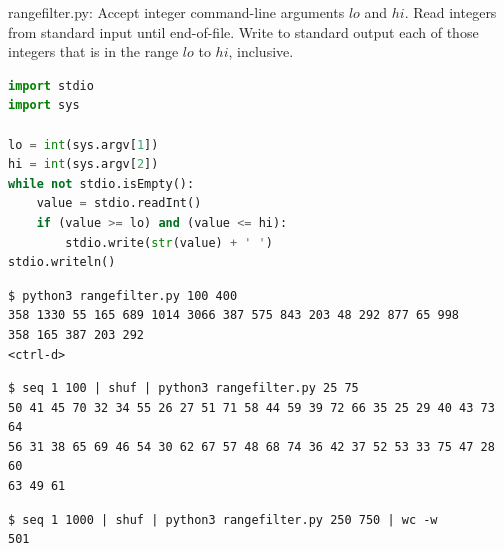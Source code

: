 \documentclass[8pt,a4paper,compress]{beamer}
\begin{document}
\begin{frame}[fragile]
\pause

\begin{framed}
\tiny rangefilter.py: Accept integer command-line arguments $lo$ and $hi$. Read integers from standard input until end-of-file. Write to standard output each of those integers that is in the range $lo$ to $hi$, inclusive.
\end{framed}

\begin{lstlisting}[language=Python,style=focusin]
import stdio
import sys

lo = int(sys.argv[1])
hi = int(sys.argv[2])
while not stdio.isEmpty():
    value = stdio.readInt()
    if (value >= lo) and (value <= hi):
        stdio.write(str(value) + ' ')
stdio.writeln()
\end{lstlisting}

\pause\bigskip

\begin{lstlisting}[language={},style=focusin]
$ python3 rangefilter.py 100 400
358 1330 55 165 689 1014 3066 387 575 843 203 48 292 877 65 998
358 165 387 203 292
<ctrl-d>
\end{lstlisting}

\pause\bigskip

\begin{lstlisting}[language={},style=focusin]
$ seq 1 100 | shuf | python3 rangefilter.py 25 75
50 41 45 70 32 34 55 26 27 51 71 58 44 59 39 72 66 35 25 29 40 43 73 64 
56 31 38 65 69 46 54 30 62 67 57 48 68 74 36 42 37 52 53 33 75 47 28 60 
63 49 61 
\end{lstlisting}

\pause\bigskip

\begin{lstlisting}[language={},style=focusin]
$ seq 1 1000 | shuf | python3 rangefilter.py 250 750 | wc -w
501
\end{lstlisting}
\end{frame}
\end{document}
